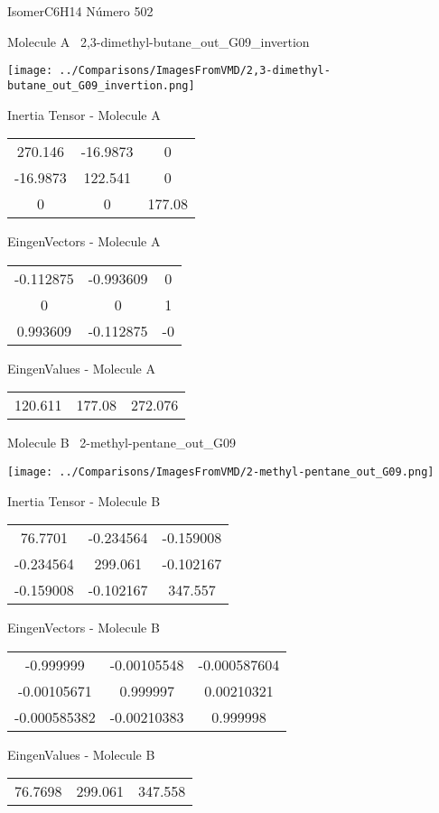 \vtab[-3cm]
\begin{center}
{\large IsomerC6H14 \tab Número 502}
\end{center}
\begin{multicols}{2}
\begin{center}

Molecule A \
2,3-dimethyl-butane\_out\_G09\_invertion

\texttt{[image: ../Comparisons/ImagesFromVMD/2,3-dimethyl-butane\_out\_G09\_invertion.png]}

Inertia Tensor - Molecule A \\
\begin{tabular}{|c c c|}
270.146	 & 	-16.9873	 & 	0	 \\
-16.9873	 & 	122.541	 & 	0	 \\
0	 & 	0	 & 	177.08
\end{tabular}

\vtab
 EingenVectors - Molecule A     \\
\begin{tabular}{|c c c|}
-0.112875	 & 	-0.993609	 & 	0	 \\
0	 & 	0	 & 	1	 \\
0.993609	 & 	-0.112875	 & 	-0
\end{tabular}

\vtab
 EingenValues - Molecule A     \\
\begin{tabular}{|c c c|}
120.611	 & 	177.08	 & 	272.076	 \\
\end{tabular}
\columnbreak

Molecule B \
2-methyl-pentane\_out\_G09

\texttt{[image: ../Comparisons/ImagesFromVMD/2-methyl-pentane\_out\_G09.png]}

Inertia Tensor - Molecule B \\
\begin{tabular}{|c c c|}
76.7701	 & 	-0.234564	 & 	-0.159008	 \\
-0.234564	 & 	299.061	 & 	-0.102167	 \\
-0.159008	 & 	-0.102167	 & 	347.557
\end{tabular}

\vtab
 EingenVectors - Molecule B     \\
\begin{tabular}{|c c c|}
-0.999999	 & 	-0.00105548	 & 	-0.000587604	 \\
-0.00105671	 & 	0.999997	 & 	0.00210321	 \\
-0.000585382	 & 	-0.00210383	 & 	0.999998
\end{tabular}

\vtab
 EingenValues - Molecule B     \\
\begin{tabular}{|c c c|}
76.7698	 & 	299.061	 & 	347.558	 \\
\end{tabular}

\end{center}
\end{multicols}

